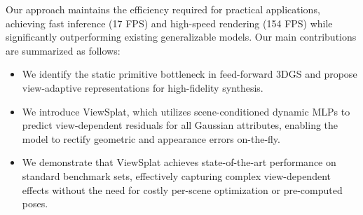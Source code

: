 \documentclass[runningheads]{llncs}
\begin{document}
Our approach maintains the efficiency required for practical applications, achieving fast inference (17 FPS) and high-speed rendering (154 FPS) while significantly outperforming existing generalizable models.
Our main contributions are summarized as follows:
\begin{itemize}
    \item We identify the static primitive bottleneck in feed-forward 3DGS and propose view-adaptive representations for high-fidelity synthesis.
    \item We introduce ViewSplat, which utilizes scene-conditioned dynamic MLPs to predict view-dependent residuals for all Gaussian attributes, enabling the model to rectify geometric and appearance errors on-the-fly.
    \item We demonstrate that ViewSplat achieves state-of-the-art performance on standard benchmark sets, effectively capturing complex view-dependent effects without the need for costly per-scene optimization or pre-computed poses.
\end{itemize}
\end{document}
